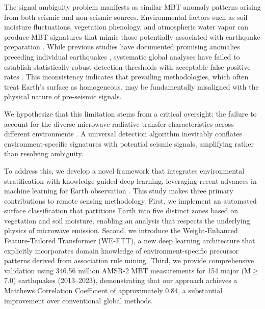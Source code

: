 \documentclass[preprint,review,12pt,authoryear]{elsarticle}
\begin{document}
The signal ambiguity problem manifests as similar MBT anomaly patterns arising from both seismic and non-seismic sources. Environmental factors such as soil moisture fluctuations, vegetation phenology, and atmospheric water vapor can produce MBT signatures that mimic those potentially associated with earthquake preparation \citep{qiCharacteristicBackgroundMicrowave2023}. While previous studies have documented promising anomalies preceding individual earthquakes \citep{akhoondzadehMultiPrecursorsAnalysis2018,qiSpatiotemporallyWeightedTwostep2020}, systematic global analyses have failed to establish statistically robust detection thresholds with acceptable false positive rates \citep{gellerEarthquakesCannotPredicted1997,cuiSatelliteThermalInfrared2019,contiSystematicReviewMetaAnalysis2021,ciceroneSystematicCompilationEarthquake2009}. This inconsistency indicates that prevailing methodologies, which often treat Earth's surface as homogeneous, may be fundamentally misaligned with the physical nature of pre-seismic signals.

We hypothesize that this limitation stems from a critical oversight: the failure to account for the diverse microwave radiative transfer characteristics across different environments \citep{njokuRetrievalLandSurface1999,guptaMicrowaveEmissionScattering2014}. A universal detection algorithm inevitably conflates environment-specific signatures with potential seismic signals, amplifying rather than resolving ambiguity. 

To address this, we develop a novel framework that integrates environmental stratification with knowledge-guided deep learning, leveraging recent advances in machine learning for Earth observation \citep{reichsteinDeepLearningEarth2019,zhuDeepLearningRemote2017}. This study makes three primary contributions to remote sensing methodology. First, we implement an automated surface classification that partitions Earth into five distinct zones based on vegetation and soil moisture, enabling an analysis that respects the underlying physics of microwave emission. Second, we introduce the Weight-Enhanced Feature-Tailored Transformer (WE-FTT), a new deep learning architecture that explicitly incorporates domain knowledge of environment-specific precursor patterns derived from association rule mining. Third, we provide comprehensive validation using 346.56 million AMSR-2 MBT measurements for 154 major (M$\ge$7.0) earthquakes (2013--2023), demonstrating that our approach achieves a Matthews Correlation Coefficient of approximately 0.84, a substantial improvement over conventional global methods.
\end{document}
